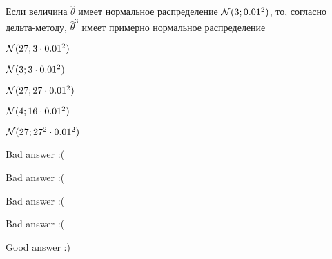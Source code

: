
\begin{question}
Если величина \(\hat\theta\) имеет нормальное распределение
\(\mathcal{N}(3;0.01^2)\), то, согласно дельта-методу, \(\hat\theta^3\) имеет
примерно нормальное распределение
\begin{answerlist}
  \item \(\mathcal{N}(27;3\cdot 0.01^2)\)
  \item \(\mathcal{N}(3;3\cdot 0.01^2)\)
  \item \(\mathcal{N}(27;27\cdot 0.01^2)\)
  \item \(\mathcal{N}(4;16\cdot 0.01^2)\)
  \item \(\mathcal{N}(27;27^2\cdot 0.01^2)\)
\end{answerlist}
\end{question}

\begin{solution}
\begin{answerlist}
  \item Bad answer :(
  \item Bad answer :(
  \item Bad answer :(
  \item Bad answer :(
  \item Good answer :)
\end{answerlist}
\end{solution}

